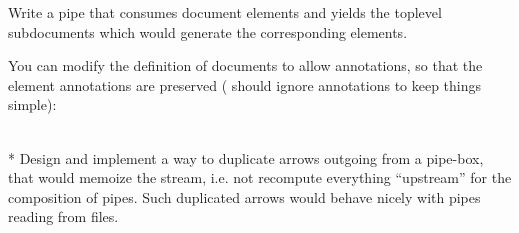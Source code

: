 \documentclass{article}
\newcommand{\tmverbatim}[1]{\text{{\ttfamily{#1}}}}
\begin{document}
\begin{exercise}
  Write a pipe that consumes document elements \tmverbatim{doc\_e} and yields
  the toplevel subdocuments \tmverbatim{doc} which would generate the
  corresponding elements.
  
  You can modify the definition of documents to allow annotations, so that the
  element annotations are preserved (\tmverbatim{gen} should ignore
  annotations to keep things simple):\\
  {}{}{\hlopt{=}}{\hlendline{}}\\
  {\hlstd{ \ }}{}{}{}{\hlopt{*
  }}{}{\hlopt{\textbar }}{}{}{}{}{}{}{\hlopt{*
  }}{}{}{}{}{\hlopt{* }}{}{\hlendline{}}
\end{exercise}

\begin{exercise}
  * Design and implement a way to duplicate arrows outgoing from a pipe-box,
  that would memoize the stream, i.e. not recompute everything ``upstream''
  for the composition of pipes. Such duplicated arrows would behave nicely
  with pipes reading from files.
  
\end{exercise}
\end{document}

